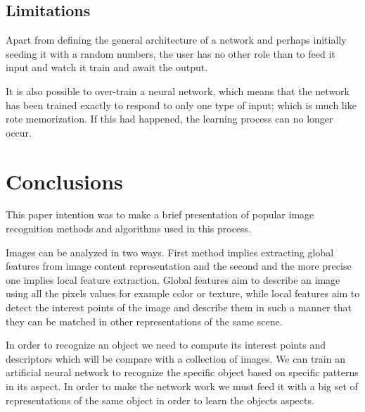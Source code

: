\documentclass[9pt,shortpaper,twoside,web]{ieeecolor}
\begin{document}
\subsection{Limitations}
Apart from defining the general architecture of a network and perhaps initially seeding it with a random numbers, the user has no other role than to feed it input and watch it train and await the output. 

It is also possible to over-train a neural network, which means that the network has been trained exactly to respond to only one type of input; which is much like rote memorization. If this had happened, the learning process can no longer occur.

\section{Conclusions}
This paper intention was to make a brief presentation of popular image recognition methods and algorithms used in this process.

Images can be analyzed in two ways. First method implies extracting global features from image content representation and the second and the more precise one implies local feature extraction. Global features aim to describe an image using all the pixels values for example color or texture, while local features aim to detect the interest points of the image and describe them in such a manner that they can be matched in other representations of the same scene.

In order to recognize an object we need to compute its interest points and descriptors which will be compare with a collection of images. We can train an artificial neural network to recognize the specific object based on specific patterns in its aspect. In order to make the network work we must feed it with a big set of representations of the same object in order to learn the objects aspects.
\end{document}
